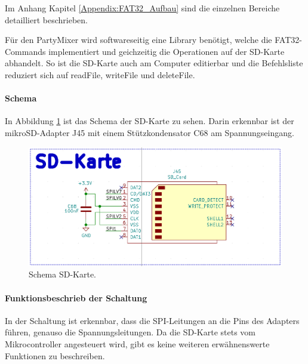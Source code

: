 Im Anhang Kapitel \ref{Appendix:FAT32_Aufbau} sind die einzelnen Bereiche detailliert beschrieben.

Für den PartyMixer wird softwareseitig eine Library benötigt, welche die FAT32-Commands  implementiert und geichzeitig die Operationen auf der SD-Karte abhandelt. So ist die SD-Karte auch am Computer editierbar und die Befehlsliste reduziert sich auf readFile, writeFile und deleteFile.

\paragraph{Schema}\mbox{}

In Abbildung \ref{fig:Schema_SD_Karte} ist das Schema der SD-Karte zu sehen. Darin erkennbar ist der mikroSD-Adapter J45 mit einem Stützkondensator C68 am Spannungseingang.

\begin{figure}[H]
\center
\includegraphics[width = 0.6 \textwidth]{graphics/Schema_SD_Karte}
\caption{Schema SD-Karte.}
\label{fig:Schema_SD_Karte}
\end{figure}

\paragraph{Funktionsbeschrieb der Schaltung}\mbox{}

In der Schaltung ist erkennbar, dass die SPI-Leitungen an die Pins des Adapters führen, genauso die Spannungsleitungen. Da die SD-Karte stets vom Mikrocontroller angesteuert wird, gibt es keine weiteren erwähnenswerte Funktionen zu beschreiben.